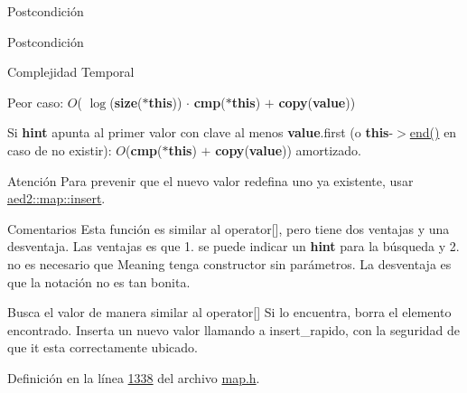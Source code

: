 \begin{DoxyPostcond}{\-Postcondición}
\begin{DoxyPostcond}{\-Postcondición}
\begin{DoxyDescription}
\item[Complejidad Temporal]
\begin{DoxyItemize}
\item Peor caso\+: $O$( $\log$({\bfseries size}({\bfseries $\ast$this})) $\cdot$ {\bfseries cmp}({\bfseries $\ast$this}) $+$ {\bfseries copy}({\bfseries value}))
\item Si {\bfseries hint} apunta al primer valor con clave al menos {\bfseries value}.first (o {\bfseries this}-\/$>$\hyperlink{classaed2_1_1map_a76023e6a56cb625513e1b5ea028bf983_a76023e6a56cb625513e1b5ea028bf983}{end()} en caso de no existir)\+: $O$({\bfseries cmp}({\bfseries $\ast$this}) $+$ {\bfseries copy}({\bfseries value})) amortizado. 
\end{DoxyItemize}
\end{DoxyDescription}

\begin{DoxyAttention}{Atención}
Para prevenir que el nuevo valor redefina uno ya existente, usar \hyperlink{classaed2_1_1map_a60aacba06b1579630b3c8e996cf248c8_a60aacba06b1579630b3c8e996cf248c8}{aed2\+::map\+::insert}. 
\end{DoxyAttention}
\begin{DoxyRemark}{Comentarios}
Esta función es similar al operator\mbox{[}\mbox{]}, pero tiene dos ventajas y una desventaja. Las ventajas es que 1. se puede indicar un {\bfseries hint} para la búsqueda y 2. no es necesario que Meaning tenga constructor sin parámetros. La desventaja es que la notación no es tan bonita.
\end{DoxyRemark}
Busca el valor de manera similar al operator\mbox{[}\mbox{]} Si lo encuentra, borra el elemento encontrado. Inserta un nuevo valor llamando a insert\+\_\+rapido, con la seguridad de que it esta correctamente ubicado. 

Definición en la línea \hyperlink{map_8h_source_l01338}{1338} del archivo \hyperlink{map_8h_source}{map.\+h}.

\mbox{\label{classaed2_1_1map_a9128a806713bcc999ebd8a97ab77e765_a9128a806713bcc999ebd8a97ab77e765}} 

\end{DoxyPostcond}
\end{DoxyPostcond}
